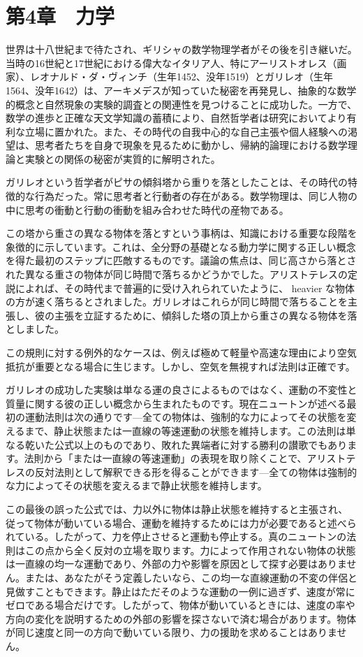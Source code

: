 \documentclass[a4paper,11pt,openany]{ltjsbook}
\begin{document}
\chapter{第4章　力学}

世界は十八世紀まで待たされ、ギリシャの数学物理学者がその後を引き継いだ。当時の16世紀と17世紀における偉大なイタリア人、特にアーリストオレス（画家）、レオナルド・ダ・ヴィンチ（生年1452、没年1519）とガリレオ（生年1564、没年1642）は、アーキメデスが知っていた秘密を再発見し、抽象的な数学的概念と自然現象の実験的調査との関連性を見つけることに成功した。一方で、数学の進歩と正確な天文学知識の蓄積により、自然哲学者は研究においてより有利な立場に置かれた。また、その時代の自我中心的な自己主張や個人経験への渇望は、思考者たちを自身で現象を見るために動かし、帰納的論理における数学理論と実験との関係の秘密が実質的に解明された。

ガリレオという哲学者がピサの傾斜塔から重りを落としたことは、その時代の特徴的な行為だった。常に思考者と行動者の存在がある。数学物理は、同じ人物の中に思考の衝動と行動の衝動を組み合わせた時代の産物である。

この塔から重さの異なる物体を落とすという事柄は、知識における重要な段階を象徴的に示しています。これは、全分野の基礎となる動力学に関する正しい概念を得た最初のステップに匹敵するものです。議論の焦点は、同じ高さから落とされた異なる重さの物体が同じ時間で落ちるかどうかでした。アリストテレスの定説によれば、その時代まで普遍的に受け入れられていたように、 heavier な物体の方が速く落ちるとされました。ガリレオはこれらが同じ時間で落ちることを主張し、彼の主張を立証するために、傾斜した塔の頂上から重さの異なる物体を落としました。

この規則に対する例外的なケースは、例えば極めて軽量や高速な理由により空気抵抗が重要となる場合に生じます。しかし、空気を無視すれば法則は正確です。

ガリレオの成功した実験は単なる運の良さによるものではなく、運動の不変性と質量に関する彼の正しい概念から生まれたものです。現在ニュートンが述べる最初の運動法則は次の通りです---全ての物体は、強制的な力によってその状態を変えるまで、静止状態または一直線の等速運動の状態を維持します。この法則は単なる乾いた公式以上のものであり、敗れた異端者に対する勝利の讃歌でもあります。法則から「または一直線の等速運動」の表現を取り除くことで、アリストテレスの反対法則として解釈できる形を得ることができます---全ての物体は強制的な力によってその状態を変えるまで静止状態を維持します。

この最後の誤った公式では、力以外に物体は静止状態を維持すると主張され、従って物体が動いている場合、運動を維持するためには力が必要であると述べられている。したがって、力を停止させると運動も停止する。真のニュートンの法則はこの点から全く反対の立場を取ります。力によって作用されない物体の状態は一直線の均一な運動であり、外部の力や影響を原因として探す必要はありません。または、あなたがそう定義したいなら、この均一な直線運動の不変の伴侶と見做すこともできます。静止はただそのような運動の一例に過ぎず、速度が常にゼロである場合だけです。したがって、物体が動いているときには、速度の率や方向の変化を説明するための外部の影響を探さないで済む場合があります。物体が同じ速度と同一の方向で動いている限り、力の援助を求めることはありません。
\end{document}
